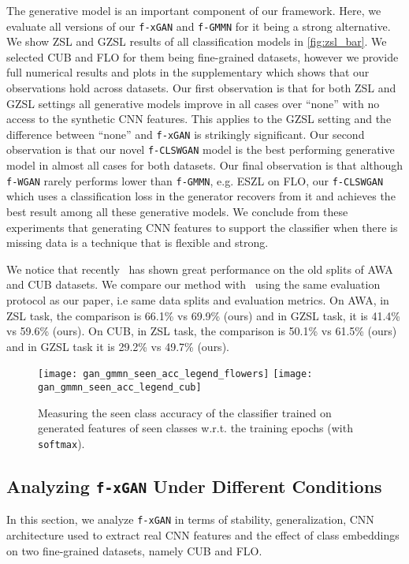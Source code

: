 \documentclass[10pt,twocolumn,letterpaper]{article}
\newcommand{\myparagraph}[1]{\vspace{6pt}\noindent{\bf #1}}
\def\mthd{\texttt{f-xGAN}\xspace}
\begin{document}
\myparagraph{ZSL and GZSL with \mthd.} The generative model is an important component of our framework. Here, we evaluate all versions of our \mthd and \texttt{f-GMMN} for it being a strong alternative. We show ZSL and GZSL results of all classification models in \autoref{fig:zsl_bar}. We selected CUB and FLO for them being fine-grained datasets, however we provide full numerical results and plots in the supplementary which shows that our observations hold across datasets. Our first observation is that for both ZSL and GZSL settings all generative models improve in all cases over ``none'' with no access to the synthetic CNN features. This applies to the GZSL setting and the difference between ``none'' and \mthd is strikingly significant. Our second observation is that our novel \texttt{f-CLSWGAN} model is the best performing generative model in almost all cases for both datasets. Our final observation is that although \texttt{f-WGAN} rarely performs lower than \texttt{f-GMMN}, e.g. ESZL on FLO, our \texttt{f-CLSWGAN} which uses a classification loss in the generator recovers from it and achieves the best result among all these generative models. We conclude from these experiments that generating CNN features to support the classifier when there is missing data is a technique that is flexible and strong.

We notice that recently~\cite{zhang2016learning} has shown great performance on the old splits of AWA and CUB datasets. We compare our method with~\cite{zhang2016learning} using the same evaluation protocol as our paper, i.e same data splits and evaluation metrics. On AWA, in ZSL task, the comparison is 66.1\% vs 69.9\% (ours) and in GZSL task,  it is 41.4\% vs 59.6\% (ours). On CUB, in ZSL task, the comparison is 50.1\% vs 61.5\% (ours) and in GZSL task it is 29.2\% vs 49.7\% (ours). 

\begin{figure}[t]
	\centering
        \texttt{[image: gan\_gmmn\_seen\_acc\_legend\_flowers]} 
		\texttt{[image: gan\_gmmn\_seen\_acc\_legend\_cub]}       
\caption{Measuring the seen class accuracy of the classifier trained on generated features of seen classes w.r.t. the training epochs (with \texttt{softmax}).} 
\vspace{-3mm}
	\label{fig:gan_seen_acc}
\end{figure}



\subsection{Analyzing \mthd Under Different Conditions}
In this section, we analyze \mthd in terms of stability, generalization, CNN architecture used to extract real CNN features and the effect of class embeddings on two fine-grained datasets, namely CUB and FLO. 
\end{document}

